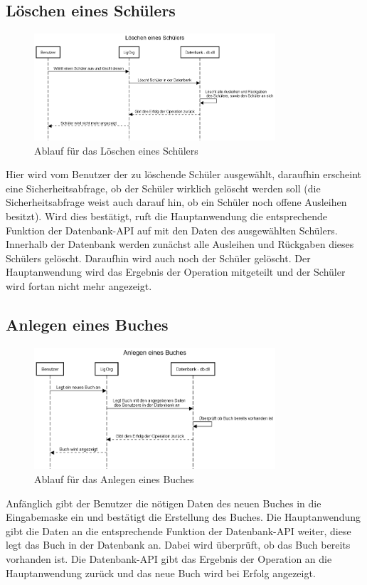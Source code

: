 \subsection{Löschen eines Schülers}
\begin{figure}[H]
	\centering
	\includegraphics[width=0.80\textwidth]{figures/laufzeit/removestudent.png}
	\caption{Ablauf für das Löschen eines Schülers}
	\label{fig:removestudent}
\end{figure}
Hier wird vom Benutzer der zu löschende Schüler ausgewählt, daraufhin erscheint eine Sicherheitsabfrage, ob der Schüler wirklich gelöscht werden soll (die Sicherheitsabfrage weist auch darauf hin, ob ein Schüler noch offene Ausleihen besitzt). Wird dies bestätigt, ruft die Hauptanwendung die entsprechende Funktion der Datenbank-API auf mit den Daten des ausgewählten Schülers. Innerhalb der Datenbank werden zunächst alle Ausleihen und Rückgaben dieses Schülers gelöscht. Daraufhin wird auch noch der Schüler gelöscht. Der Hauptanwendung wird das Ergebnis der Operation mitgeteilt und der Schüler wird fortan nicht mehr angezeigt.

\subsection{Anlegen eines Buches}
\begin{figure}[H]
	\centering
	\includegraphics[width=0.80\textwidth]{figures/laufzeit/newbook.png}
	\caption{Ablauf für das Anlegen eines Buches}
	\label{fig:newbook}
\end{figure}
Anfänglich gibt der Benutzer die nötigen Daten des neuen Buches in die Eingabemaske ein und bestätigt die Erstellung des Buches. Die Hauptanwendung gibt die Daten an die entsprechende Funktion der Datenbank-API weiter, diese legt das Buch in der Datenbank an. Dabei wird überprüft, ob das Buch bereits vorhanden ist. Die Datenbank-API gibt das Ergebnis der Operation an die Hauptanwendung zurück und das neue Buch wird bei Erfolg angezeigt.

